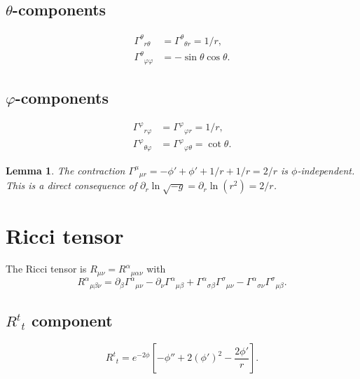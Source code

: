 \documentclass[11pt,letterpaper]{article}
\newtheorem{lemma}[theorem]{Lemma}
\numberwithin{equation}{section}
\begin{document}
\subsection{$\theta$-components}
\begin{align}
  \Gamma^\theta{}_{r\theta} &= \Gamma^\theta{}_{\theta r} = 1/r, \label{eq:gamma_thrth}\\
  \Gamma^\theta{}_{\varphi\varphi} &= -\sin\theta\cos\theta. \label{eq:gamma_thphph}
\end{align}

\subsection{$\varphi$-components}
\begin{align}
  \Gamma^\varphi{}_{r\varphi} &= \Gamma^\varphi{}_{\varphi r} = 1/r, \label{eq:gamma_phrph}\\
  \Gamma^\varphi{}_{\theta\varphi} &= \Gamma^\varphi{}_{\varphi\theta} = \cot\theta. \label{eq:gamma_phphth}
\end{align}

\begin{lemma}
The contraction $\Gamma^\mu{}_{\mu r} = -\phi' + \phi' + 1/r + 1/r = 2/r$ is
$\phi$-independent. This is a direct consequence of
$\partial_r\ln\sqrt{-g} = \partial_r\ln(r^2) = 2/r$.
\end{lemma}

\section{Ricci tensor}
\label{sec:ricci}

The Ricci tensor is $R_{\mu\nu} = R^\alpha{}_{\mu\alpha\nu}$ with
\begin{equation}
  R^\alpha{}_{\mu\beta\nu} = \partial_\beta\Gamma^\alpha{}_{\mu\nu}
    - \partial_\nu\Gamma^\alpha{}_{\mu\beta}
    + \Gamma^\alpha{}_{\sigma\beta}\Gamma^\sigma{}_{\mu\nu}
    - \Gamma^\alpha{}_{\sigma\nu}\Gamma^\sigma{}_{\mu\beta}.
\end{equation}

\subsection{$R^t{}_t$ component}
\begin{equation}
\label{eq:Rtt}
  R^t{}_t = e^{-2\phi}\!\left[-\phi'' + 2(\phi')^2 - \frac{2\phi'}{r}\right].
\end{equation}
\end{document}
